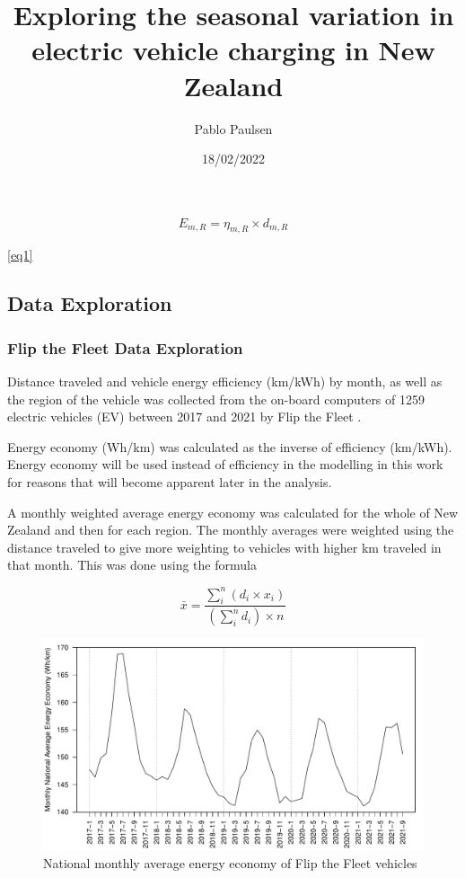 \documentclass[
]{article}
\title{Exploring the seasonal variation in electric vehicle charging in
New Zealand}
\author{Pablo Paulsen}
\date{18/02/2022}
\begin{document}
\maketitle

\begin{equation}
\label{eq1}
E_{m,R} = \eta_{m,R} \times d_{m,R}
\end{equation}

\ref{eq1}

\hypertarget{data-exploration}{%
\subsection{Data Exploration}\label{data-exploration}}

\hypertarget{flip-the-fleet-data-exploration}{%
\subsubsection{Flip the Fleet Data
Exploration}\label{flip-the-fleet-data-exploration}}

Distance traveled and vehicle energy efficiency (km/kWh) by month, as
well as the region of the vehicle was collected from the on-board
computers of 1259 electric vehicles (EV) between 2017 and 2021 by Flip
the Fleet \cite{ftf}.

Energy economy (Wh/km) was calculated as the inverse of efficiency
(km/kWh). Energy economy will be used instead of efficiency in the
modelling in this work for reasons that will become apparent later in
the analysis.

A monthly weighted average energy economy was calculated for the whole
of New Zealand and then for each region. The monthly averages were
weighted using the distance traveled to give more weighting to vehicles
with higher km traveled in that month. This was done using the formula

\[\bar{x} = \frac{\sum_{i}^{n} (d_i\times x_i)}{\left(\sum_{i}^{n} d_i\right)\times n}\]

\begin{figure}
\centering
\includegraphics{mixed_model_files/figure-latex/consum_plot-1.pdf}
\caption{National monthly average energy economy of Flip the Fleet
vehicles\label{fig:consum_plot}}
\end{figure}
\end{document}
